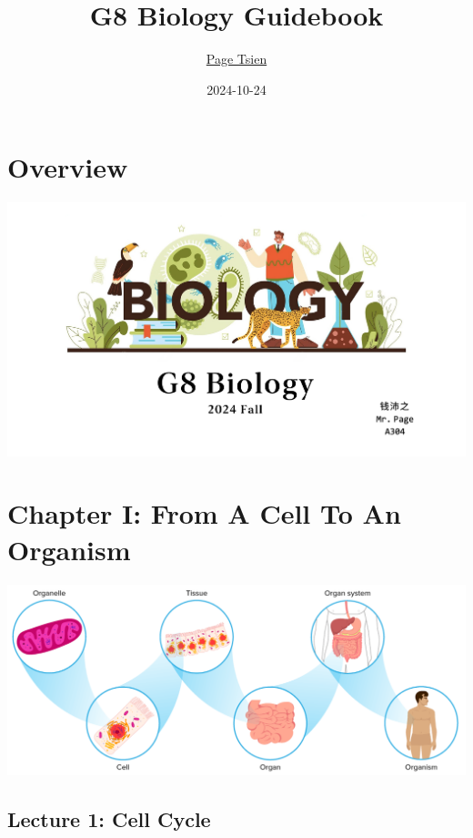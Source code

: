 \documentclass[
]{book}
\title{G8 Biology Guidebook}
\author{\href{https://pagius5.github.io/}{Page Tsien}}
\date{2024-10-24}
\begin{document}
\maketitle

{
\setcounter{tocdepth}{1}
\tableofcontents
}
\hypertarget{overview}{%
\chapter{Overview}\label{overview}}

\includegraphics{./img/g8-bio.png}

\hypertarget{chapter-i-from-a-cell-to-an-organism}{%
\chapter{Chapter I: From A Cell To An Organism}\label{chapter-i-from-a-cell-to-an-organism}}

\includegraphics{./img/ch1.png}

\hypertarget{lecture-1-cell-cycle}{%
\section{Lecture 1: Cell Cycle}\label{lecture-1-cell-cycle}}
\end{document}
